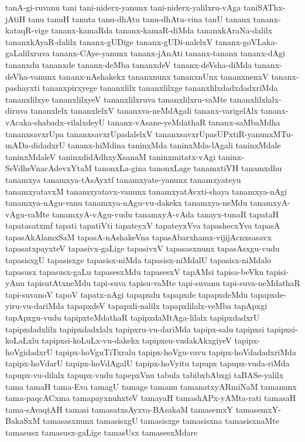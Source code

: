 {tanA-gi-ruvanu
tani
tani-niderx-yanunx
tani-niderx-yalilxru-vAga
taniSAThx-jAtiH
tanu
tanuH
tanuta
tanu-dhAtu
tanu-dhAtu-vina
tanU
tananx
tananx-kataqR-vige
tananx-kamaRda
tananx-kamaR-diMda
tananxkAraNa-dalilx
tananxkAyaR-dalilx
tananx-gUDige
tananx-gUDi-nalelxV
tananx-goVLaka-gaLalilxruva
tananx-CAye-yanunx
tananx-jAnAti
tananx-tananx
tananx-dAgi
tananxdu
tananxde
tananx-deMba
tananxdeV
tananx-deVsha-diMda
tananx-deVha-vanunx
tananx-nAshakekx
tananxnunx
tananxnUnx
tananxnenxV
tananx-pashayxti
tananxpirxyege
tananxlilx
tananxlilxge
tananxlilxdadxdadxriMda
tananxlilxye
tananxlilxyeV
tananxlilxruva
tananxlilxru-vaMte
tananxlilxlalx-diruva
tananxlelx
tananxlelxV
tananxva-neMdAgali
tananx-varigelAlx
tananx-vAcaka-shabadx-vilalxdeyU
tananx-vAsane-yeMdathaR
tananx-saMbaMdha
tananxsavxrUpa
tananxsavxrUpadalelxV
tananxsavxrUpasUPxtiR-yanunxMTu-mADa-didadxrU
tananx-hiMdina
taninxMda
taninxMda-lAgali
taninxMdale
taninxMdaleV
taninxdidAdhxyXsanaM
taninxmitatx-vAgi
taninx-SeVdheVnacAdevxYtaM
tanonxLa-gina
tanonxLage
tanamxtiVH
tanamxdhu
tanamxya
tanamxya-tAsAyxtf
tanamxyate-yanunx
tanamxyateyu
tanamxyatavxM
tanamxyatavx-vanunx
tanamxyatAvxti-shaya
tanamxya-nAgi
tanamxya-nAgu-vanu
tanamxya-nAgu-vu-dakekx
tanamxya-neMdu
tanamxyA-vAgu-vaMte
tanamxyA-vAgu-vudu
tanamxyA-vAda
tanayx-tunaR
tapataH
tapatasatxmf
tapati
tapatiVti
tapateyxV
tapateyxVva
tapashecxYva
tapasA
tapasAkAlamxSaM
tapasA-nAshakeVna
tapasAbarxhamx-vijijAcnxsasavx
tapasatxpayxteV
tapasivx-gaLige
tapasivxV
tapasasxnunx
tapasAsxgu-vudu
tapasisxgU
tapasisxge
tapasisx-niMda
tapasisx-niMdalU
tapasisx-niMdalo
tapasusx
tapasusx-gaLu
tapasesxMdu
tapasesxV
tapAMsi
tapisa-beVku
tapisi-yAnu
tapisutAtxneMdu
tapi-suva
tapisu-vaMte
tapi-suvanu
tapi-suva-neMdathaR
tapi-suvanoV
tapoV
tapatx-nAgi
tapapxdu
tapapxde
tapapxdeMdu
tapapxde-yiru-vu-dariMda
tapapxdeV
tapapxli-nalilx
tapapxlilalx-veMba
tapApxgi
tapApxgu-vudu
tapipxteMdathaR
tapipxdaMtAga-lilalx
tapipxdadxrU
tapipxdadxlilx
tapipxdadxlalx
tapipxru-vu-dariMda
tapipx-salu
tapipxsi
tapipxsi-koLaLxlu
tapipxsi-koLuLx-vu-dakekx
tapipxsu-vudakAkxgiyeV
tapipx-hoVgidadxrU
tapipx-hoVguTiTxralu
tapipx-hoVgu-vavu
tapipx-hoVdadadxriMda
tapipx-hoVdarU
tapipx-hoVdAgalU
tapipx-hoVyitu
tapupx
tapupx-vuda-riMda
tapupx-vu-dilalx
tapupx-vudu
tapepxVnu
tabula
tabibxbAbxgi
taBASe-yalilx
tama
tamaH
tama-Eva
tamagU
tamage
tamanu
tamanatxyARmiNaM
tamanunx
tama-paqcACxma
tamapayxnuhxteV
tamayaH
tamashAPx-yAMta-rati
tamasaH
tama-sAvaqtAH
tamasi
tamasatxsAyxva-BAsakaM
tamasemxY
tamasemxY-BakaSxM
tamasasxnunx
tamasisxgU
tamasisxge
tamasisxna
tamasisxnaMte
tamasusx
tamasusx-gaLige
tamasUsx
tamasesxMdare
}
